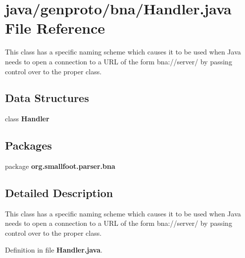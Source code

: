 \section{java/genproto/bna/\+Handler.java File Reference}
\label{genproto_2bna_2Handler_8java}


This class has a specific naming scheme which causes it to be used when Java needs to open a connection to a U\+R\+L of the form bna\+://server/ by passing control over to the proper class.  


\subsection*{Data Structures}
\begin{DoxyCompactItemize}
\item 
class {\bf Handler}
\end{DoxyCompactItemize}
\subsection*{Packages}
\begin{DoxyCompactItemize}
\item 
package {\bf org.\+smallfoot.\+parser.\+bna}
\end{DoxyCompactItemize}


\subsection{Detailed Description}
This class has a specific naming scheme which causes it to be used when Java needs to open a connection to a U\+R\+L of the form bna\+://server/ by passing control over to the proper class. 



Definition in file {\bf Handler.\+java}.

